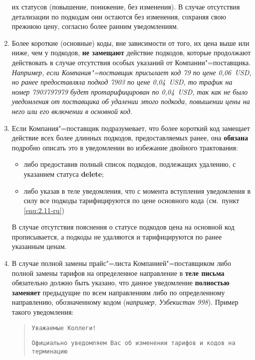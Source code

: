 \begin{Form}
\begin{enumerate}[label=\thesection.\arabic*.]
    их статусов (повышение, понижение, без изменения). В случае отсутствия
    детализации по подкодам они остаются без изменения, сохраняя свою
    прежнюю цену, согласно более ранним уведомлениям. 
  \item Более короткие (основные) коды, вне зависимости от того, их цена выше
    или ниже, чем у подкодов, \textbf{не замещают} действие подкодов, которые продолжают
    действовать в случае отсутствия особых указаний от Компании"=поставщика.
    \textit{Например, если Компания"=поставщик присылает код 79 по цене
    0,06~USD, но ранее предоставляла подкод 7903 по цене 0,04~USD,
    то трафик на номер 7903797979 будет протарифицирован
    по 0,04~USD, так как не было уведомления от поставщика об удалении
    этого подкода, повышении цены на него или его включении в основной
    код}. 
  \item Если Компания"=поставщик подразумевает, что более короткий код замещает
    действие всех более длинных подкодов, предоставляемых ранее, она \textbf{обязана}
    подробно описать это в уведомлении во избежание двойного трактования:
    \begin{itemize}
    \item либо предоставив полный список подкодов, подлежащих удалению, с указанием
      статуса \textbf{\flqq{}de\-le\-te\frqq{}};
    \item либо указав в теле уведомления,
      что с момента вступления уведомления в силу все подкоды тарифицируются
      по цене основного кода (см.\ пункт \ref{enu:2.11-ru})
    \end{itemize}
    В случае отсутствия пояснения о статусе подкодов цена на основной код
    прописывается, а подкоды не удаляются и тарифицируются по ранее указанным ценам. 
  \item \label{enu:2.11-ru}В случае полной замены прайс"=листа Компанией"=поставщиком
    либо полной замены тарифов на определенное направление в \textbf{теле письма}
    обязательно должно быть указано, что данное уведомление \textbf{полностью
    заменяет} предыдущие по всем направлениям либо по определенному направлению,
    обозначенному кодом (\textit{например, Узбекистан 998}). Пример такого
    уведомления: 
    \begin{quote}
      \begin{center}
        \texttt{Уважаемые Коллеги!}
      \end{center}
      \begin{flushleft}
        \indent\texttt{Официально уведомляем Вас об изменении тарифов и кодов на терминацию
}
\end{flushleft}
\end{quote}
\end{enumerate}
\end{Form}
